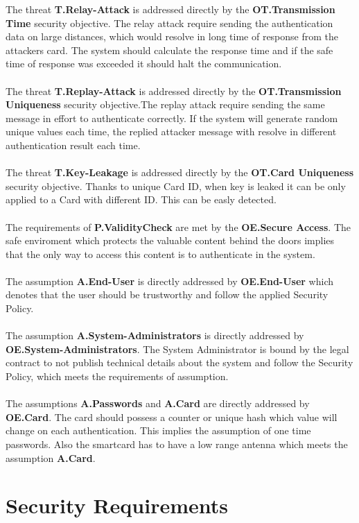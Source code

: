 \documentclass[10pt,titlepage]{article}
\begin{document}
The threat \textbf{T.Relay-Attack} is addressed directly by the \textbf{OT.Transmission Time} security objective. The relay attack require sending the authentication data on large distances, which would resolve in long time of response from the attackers card. The system should calculate the response time and if the safe time of response was exceeded it should halt the communication.
\\ \\
The threat \textbf{T.Replay-Attack} is addressed directly by the \textbf{OT.Transmission Uniqueness} security objective.The replay attack require sending the same message in effort to authenticate correctly. If the system will generate random unique values each time, the replied attacker message with resolve in different authentication result each time.
\\ \\
The threat \textbf{T.Key-Leakage} is addressed directly by the \textbf{OT.Card Uniqueness} security objective. Thanks to unique Card ID, when key is leaked it can be only applied to a Card with different ID. This can be easly detected.
\\ \\
The requirements of \textbf{P.ValidityCheck}  are met by the \textbf{OE.Secure Access}. The safe enviroment which protects the valuable content behind the doors implies that the only way to access this content is to authenticate in the system.
\\ \\
The assumption \textbf{A.End-User} is directly addressed by \textbf{OE.End-User} which denotes that the user should be trustworthy and follow the applied Security Policy.
\\ \\
The assumption \textbf{A.System-Administrators} is directly addressed by \textbf{OE.System-Administrators}. The System Administrator is bound by the legal contract to not publish technical details about the system and follow the Security Policy, which meets the requirements of assumption.
\\ \\
The assumptions \textbf{A.Passwords} and \textbf{A.Card} are directly addressed by \textbf{OE.Card}. The card should possess a counter or unique hash which value will change on each authentication. This implies the assumption of one time passwords. Also the smartcard has to have a low range antenna which meets the assumption \textbf{A.Card}.

\section{Security Requirements}
\end{document}
